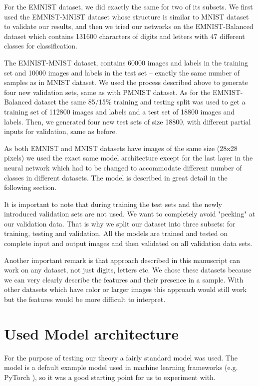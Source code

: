 \documentclass[b5paper]{book}
\let\cite\parencite
\begin{document}
For the EMNIST dataset, we did exactly the same for two of its subsets. We first used the EMNIST-MNIST dataset whose structure is similar to MNIST dataset to validate our results, and then we tried our networks on the EMNIST-Balanced dataset which contains 131600 characters of digits and letters with 47 different classes for classification. 

The EMNIST-MNIST dataset, contains 60000 images and labels in the training set and 10000 images and labels in the test set -- exactly the same number of samples as in MNIST dataset. We used the process described above to generate four new validation sets, same as with PMNIST dataset. As for the EMNIST-Balanced dataset the same 85/15\% training and testing split was used to get a training set of 112800 images and labels and a test set of 18800 images and labels. Then, we generated four new test sets of size 18800, with different partial inputs for validation, same as before.

As both EMNIST and MNIST datasets have images of the same size (28x28 pixels) we used the exact same model architecture except for the last layer in the neural network which had to be changed to accommodate different number of classes in different datasets. The model is described in great detail in the following section.

It is important to note that during training the test sets and the newly introduced validation sets are not used. We want to completely avoid "peeking" at our validation data. That is why we split our dataset into three subsets: for training, testing and validation. All the models are trained and tested on complete input and output images and then validated on all validation data sets.

Another important remark is that approach described in this manuscript can work on any dataset, not just digits, letters etc. We chose these datasets because we can very clearly describe the features and their presence in a sample. With other datasets which have color or larger images this approach would still work but the features would be more difficult to interpret.

\section{Used Model architecture}

For the purpose of testing our theory a fairly standard model was used. The model is a default example model used in machine learning frameworks (e.g. PyTorch \cite{paszke2017pytorch}), so it was a good starting point for us to experiment with.
\end{document}
